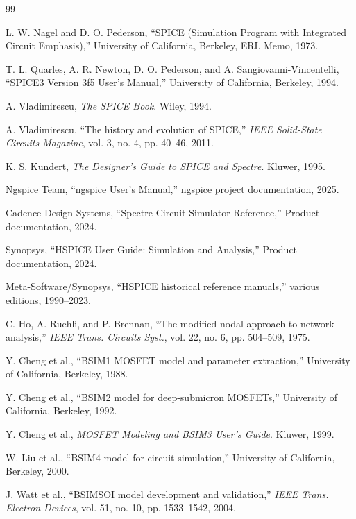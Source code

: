 \documentclass[12pt,a4paper,oneside]{report}
\begin{document}
\begin{thebibliography}{99}

L. W. Nagel and D. O. Pederson, ``SPICE (Simulation Program with Integrated Circuit Emphasis),'' University of California, Berkeley, ERL Memo, 1973.

T. L. Quarles, A. R. Newton, D. O. Pederson, and A. Sangiovanni-Vincentelli, ``SPICE3 Version 3f5 User's Manual,'' University of California, Berkeley, 1994.

A. Vladimirescu, \emph{The SPICE Book}. Wiley, 1994.

A. Vladimirescu, ``The history and evolution of SPICE,'' \emph{IEEE Solid-State Circuits Magazine}, vol. 3, no. 4, pp. 40--46, 2011.

K. S. Kundert, \emph{The Designer's Guide to SPICE and Spectre}. Kluwer, 1995.

Ngspice Team, ``ngspice User's Manual,'' ngspice project documentation, 2025.

Cadence Design Systems, ``Spectre Circuit Simulator Reference,'' Product documentation, 2024.

Synopsys, ``HSPICE User Guide: Simulation and Analysis,'' Product documentation, 2024.

Meta-Software/Synopsys, ``HSPICE historical reference manuals,'' various editions, 1990--2023.

C. Ho, A. Ruehli, and P. Brennan, ``The modified nodal approach to network analysis,'' \emph{IEEE Trans. Circuits Syst.}, vol. 22, no. 6, pp. 504--509, 1975.

Y. Cheng et al., ``BSIM1 MOSFET model and parameter extraction,'' University of California, Berkeley, 1988.

Y. Cheng et al., ``BSIM2 model for deep-submicron MOSFETs,'' University of California, Berkeley, 1992.

Y. Cheng et al., \emph{MOSFET Modeling and BSIM3 User's Guide}. Kluwer, 1999.

W. Liu et al., ``BSIM4 model for circuit simulation,'' University of California, Berkeley, 2000.

J. Watt et al., ``BSIMSOI model development and validation,'' \emph{IEEE Trans. Electron Devices}, vol. 51, no. 10, pp. 1533--1542, 2004.


\end{thebibliography}
\end{document}
